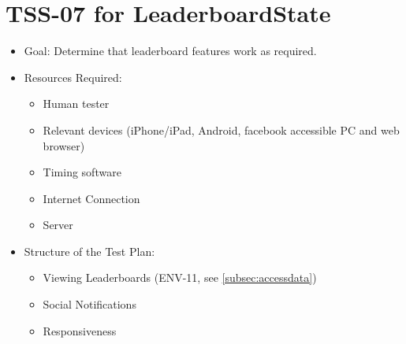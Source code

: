 \section{TSS-07 for LeaderboardState}
\begin{itemize}
\item Goal: Determine that leaderboard features work as required.

\item Resources Required:
\begin{itemize}
\item Human tester
\item Relevant devices (iPhone/iPad, Android, facebook accessible PC and web browser)
\item Timing software
\item Internet Connection 
\item Server
\end{itemize}

\item Structure of the Test Plan: 
\begin{itemize}
\item Viewing Leaderboards (ENV-11, see \ref{subsec:accessdata})
\item Social Notifications
\item Responsiveness
\end{itemize}
\end{itemize}

